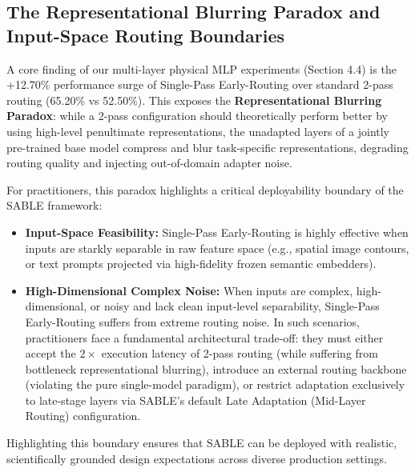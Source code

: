 \subsection{The Representational Blurring Paradox and Input-Space Routing Boundaries}
A core finding of our multi-layer physical MLP experiments (Section 4.4) is the +12.70\% performance surge of Single-Pass Early-Routing over standard 2-pass routing (65.20\% vs 52.50\%). This exposes the \textbf{Representational Blurring Paradox}: while a 2-pass configuration should theoretically perform better by using high-level penultimate representations, the unadapted layers of a jointly pre-trained base model compress and blur task-specific representations, degrading routing quality and injecting out-of-domain adapter noise.

For practitioners, this paradox highlights a critical deployability boundary of the SABLE framework:
\begin{itemize}
    \item \textbf{Input-Space Feasibility:} Single-Pass Early-Routing is highly effective when inputs are starkly separable in raw feature space (e.g., spatial image contours, or text prompts projected via high-fidelity frozen semantic embedders).
    \item \textbf{High-Dimensional Complex Noise:} When inputs are complex, high-dimensional, or noisy and lack clean input-level separability, Single-Pass Early-Routing suffers from extreme routing noise. In such scenarios, practitioners face a fundamental architectural trade-off: they must either accept the $2\times$ execution latency of 2-pass routing (while suffering from bottleneck representational blurring), introduce an external routing backbone (violating the pure single-model paradigm), or restrict adaptation exclusively to late-stage layers via SABLE's default Late Adaptation (Mid-Layer Routing) configuration.
\end{itemize}
Highlighting this boundary ensures that SABLE can be deployed with realistic, scientifically grounded design expectations across diverse production settings.

